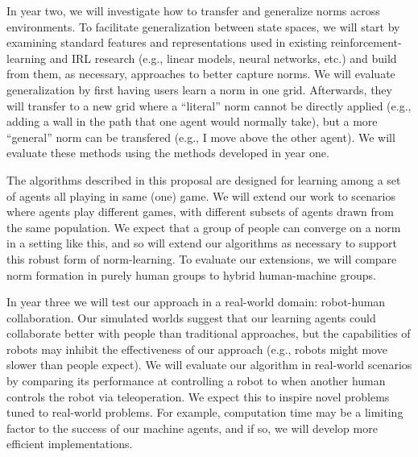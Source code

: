 In year two, we will investigate how to transfer and generalize norms
across environments. To facilitate generalization between state
spaces, we will start by examining standard features and
representations used in existing reinforcement-learning 
and IRL research (e.g., linear models, neural networks, etc.) and
build from them, as necessary, approaches to better capture norms. We
will evaluate generalization by first having users learn a norm in one
grid. Afterwards, they will transfer to a new grid where a ``literal''
norm cannot be directly applied (e.g., adding a wall in the path that
one agent would normally take), but a more ``general'' norm can be
transfered (e.g., I move above the other agent). We will evaluate
these methods using the methods developed in year one.

The algorithms described in this proposal are designed for learning
among a set of agents all playing in same (one) game. We will extend
our work to scenarios where agents play different games, with
different subsets of agents drawn from the same population. We expect
that a group of people can converge on a norm in a setting like this,
and so will extend our algorithms as necessary to support this robust
form of norm-learning. To evaluate our extensions, we will compare
norm formation in purely human groups to hybrid human-machine groups.

In year three we will test our approach in a real-world domain:
robot-human collaboration. Our simulated worlds suggest that our
learning agents could collaborate better with people than traditional
approaches, but the capabilities of robots may inhibit the
effectiveness of our approach (e.g., robots might move slower than
people expect). We will evaluate our algorithm in real-world scenarios
by comparing its performance at controlling a robot to when another
human controls the robot via teleoperation. We expect this to inspire
novel problems tuned to real-world problems. For example, computation
time may be a limiting factor to the success of our machine agents,
and if so, we will develop more efficient implementations.

